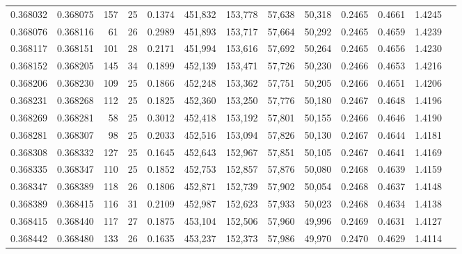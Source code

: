 \begin{tabular}{rrrrrrrrrrrrr}
0.368032 & 0.368075 &   157 &  25 &                                     0.1374 & 451,832 & 153,778 &  57,638 &  50,318 & 0.2465 & 0.4661 & 1.4245 \\
0.368076 & 0.368116 &    61 &  26 &                                     0.2989 & 451,893 & 153,717 &  57,664 &  50,292 & 0.2465 & 0.4659 & 1.4239 \\
0.368117 & 0.368151 &   101 &  28 &                                     0.2171 & 451,994 & 153,616 &  57,692 &  50,264 & 0.2465 & 0.4656 & 1.4230 \\
0.368152 & 0.368205 &   145 &  34 &                                     0.1899 & 452,139 & 153,471 &  57,726 &  50,230 & 0.2466 & 0.4653 & 1.4216 \\
0.368206 & 0.368230 &   109 &  25 &                                     0.1866 & 452,248 & 153,362 &  57,751 &  50,205 & 0.2466 & 0.4651 & 1.4206 \\
0.368231 & 0.368268 &   112 &  25 &                                     0.1825 & 452,360 & 153,250 &  57,776 &  50,180 & 0.2467 & 0.4648 & 1.4196 \\
0.368269 & 0.368281 &    58 &  25 &                                     0.3012 & 452,418 & 153,192 &  57,801 &  50,155 & 0.2466 & 0.4646 & 1.4190 \\
0.368281 & 0.368307 &    98 &  25 &                                     0.2033 & 452,516 & 153,094 &  57,826 &  50,130 & 0.2467 & 0.4644 & 1.4181 \\
0.368308 & 0.368332 &   127 &  25 &                                     0.1645 & 452,643 & 152,967 &  57,851 &  50,105 & 0.2467 & 0.4641 & 1.4169 \\
0.368335 & 0.368347 &   110 &  25 &                                     0.1852 & 452,753 & 152,857 &  57,876 &  50,080 & 0.2468 & 0.4639 & 1.4159 \\
0.368347 & 0.368389 &   118 &  26 &                                     0.1806 & 452,871 & 152,739 &  57,902 &  50,054 & 0.2468 & 0.4637 & 1.4148 \\
0.368389 & 0.368415 &   116 &  31 &                                     0.2109 & 452,987 & 152,623 &  57,933 &  50,023 & 0.2468 & 0.4634 & 1.4138 \\
0.368415 & 0.368440 &   117 &  27 &                                     0.1875 & 453,104 & 152,506 &  57,960 &  49,996 & 0.2469 & 0.4631 & 1.4127 \\
0.368442 & 0.368480 &   133 &  26 &                                     0.1635 & 453,237 & 152,373 &  57,986 &  49,970 & 0.2470 & 0.4629 & 1.4114 \\

\end{tabular}
